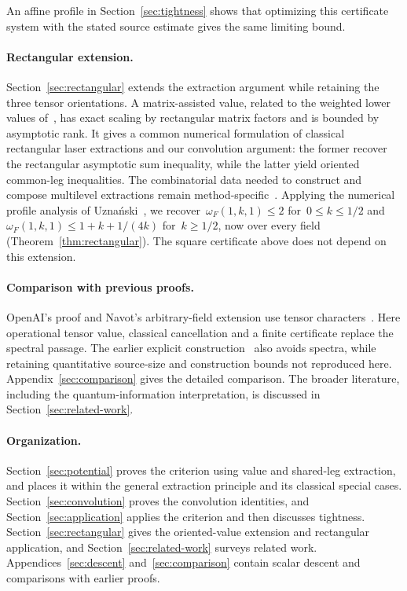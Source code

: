 \documentclass[11pt,letterpaper]{article}
\theoremstyle{definition}
\numberwithin{equation}{section}
\begin{document}
An affine profile in Section~\ref{sec:tightness} shows that optimizing this certificate system with the stated source estimate gives the same limiting bound.

\paragraph{Rectangular extension.}
Section~\ref{sec:rectangular} extends the extraction argument while retaining the three tensor orientations. A matrix-assisted value, related to the weighted lower values of~\cite{ALP26}, has exact scaling by rectangular matrix factors and is bounded by asymptotic rank. It gives a common numerical formulation of classical rectangular laser extractions and our convolution argument: the former recover the rectangular asymptotic sum inequality, while the latter yield oriented common-leg inequalities. The combinatorial data needed to construct and compose multilevel extractions remain method-specific~\cite{LGU18,VXXZ24}. Applying the numerical profile analysis of Uzna\'nski~\cite{Uznanski26}, we recover~$\omega_F(1,k,1)\leq2$ for~$0\leq k\leq1/2$ and~$\omega_F(1,k,1)\leq1+k+1/(4k)$ for~$k\geq1/2$, now over every field (Theorem~\ref{thm:rectangular}). The square certificate above does not depend on this extension.

\paragraph{Comparison with previous proofs.}
OpenAI's proof and Navot's arbitrary-field extension use tensor characters~\cite{OpenAI,NavotNote26}. Here operational tensor value, classical cancellation and a finite certificate replace the spectral passage. The earlier explicit construction~\cite{Extraction} also avoids spectra, while retaining quantitative source-size and construction bounds not reproduced here. Appendix~\ref{sec:comparison} gives the detailed comparison. The broader literature, including the quantum-information interpretation, is discussed in Section~\ref{sec:related-work}.

\paragraph{Organization.}
Section~\ref{sec:potential} proves the criterion using value and shared-leg extraction, and places it within the general extraction principle and its classical special cases. Section~\ref{sec:convolution} proves the convolution identities, and Section~\ref{sec:application} applies the criterion and then discusses tightness. Section~\ref{sec:rectangular} gives the oriented-value extension and rectangular application, and Section~\ref{sec:related-work} surveys related work. Appendices~\ref{sec:descent} and~\ref{sec:comparison} contain scalar descent and comparisons with earlier proofs.
\end{document}
